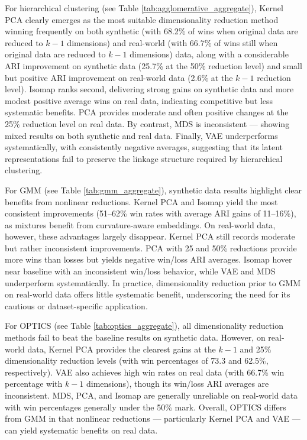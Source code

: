 \documentclass[preprint,12pt]{elsarticle}
\begin{document}
For hierarchical clustering (see Table \ref{tab:agglomerative_aggregate}), Kernel PCA clearly emerges as the most suitable dimensionality reduction method winning frequently on both synthetic (with 68.2\% of wins when original data are reduced to $k-1$ dimensions) and real-world (with 66.7\% of wins still when original data are reduced to $k-1$ dimensions) data, along with a considerable ARI improvement on synthetic data (25.7\% at the 50\% reduction level) and small but positive ARI improvement on real-world data (2.6\% at the $k-1$ reduction level). Isomap ranks second, delivering strong gains on synthetic data and more modest positive average wins on real data, indicating competitive but less systematic benefits. PCA provides moderate and often positive changes at the 25\% reduction level on real data. By contrast, MDS is inconsistent — showing mixed results on both synthetic and real data. Finally, VAE underperforms systematically, with consistently negative averages, suggesting that its latent representations fail to preserve the linkage structure required by hierarchical clustering.

For GMM (see Table \ref{tab:gmm_aggregate}), synthetic data results highlight clear benefits from nonlinear reductions. Kernel PCA and Isomap yield the most consistent improvements (51–62\% win rates with average ARI gains of 11–16\%), as mixtures benefit from curvature-aware embeddings. On real-world data, however, these advantages largely disappear. Kernel PCA still records moderate but rather inconsistent improvements. PCA with 25 and 50\% reductions provide more wins than losses but yields negative win/loss ARI averages. Isomap hover near baseline with an inconsistent win/loss behavior, while VAE and MDS underperform systematically. In practice, dimensionality reduction prior to GMM on real-world data offers little systematic benefit, underscoring the need for its cautious or dataset-specific application.

For OPTICS (see Table \ref{tab:optics_aggregate}), all dimensionality reduction methods fail to beat the baseline results on synthetic data. However, on real-world data, Kernel PCA provides the clearest gains at the $k-1$ and 25\% dimensionality reduction levels (with win percentages of 73.3 and 62.5\%, respectively). VAE also achieves high win rates on real data (with 66.7\% win percentage with $k-1$ dimensions), though its win/loss ARI averages are inconsistent. MDS, PCA, and Isomap are generally unreliable on real-world data with win percentages generally under the 50\% mark. Overall, OPTICS differs from GMM in that nonlinear reductions — particularly Kernel PCA and VAE — can yield systematic benefits on real data.
\end{document}
